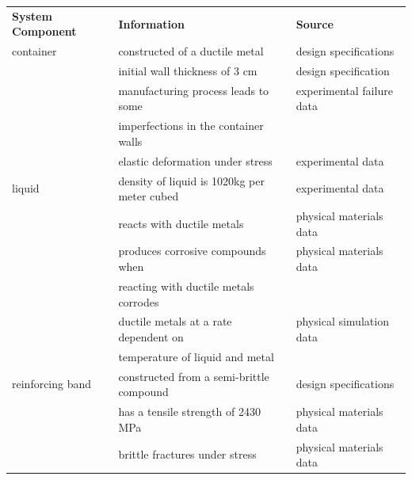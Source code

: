 \begin{table}
\begin{center}
    \begin{tabular}{lll}\Xhline{2\arrayrulewidth}
    \textbf{System Component} & \textbf{Information}                                            & \textbf{Source}          \\
    \Xhline{2\arrayrulewidth}
    container        & constructed of a ductile metal                                           & design specifications     \\
    ~                & initial wall thickness of 3 cm                                                & design specification      \\
    ~                & manufacturing process leads to some                                      & experimental failure data \\
    ~                & \qquad imperfections in the container walls & \\
    ~                & elastic deformation under stress                                         & experimental data         
    \\\hline
    liquid           & density of liquid is 1020kg per meter cubed                              & experimental data         \\
    ~                & reacts with ductile metals                                               & physical materials data   \\
    ~                & produces corrosive compounds when                      & physical materials data   \\
    ~                & \qquad reacting with ductile metals corrodes & \\ 
    ~               &  \qquad ductile metals at a rate dependent on & physical simulation data \\
    ~                & \qquad temperature of liquid and metal & \\ \hline
    reinforcing band & constructed from a semi-brittle compound                         & design specifications     \\
    ~                & has a tensile strength of 2430 MPa                                         & physical materials data   \\
    ~                & brittle fractures under stress                                           & physical materials data    
    

\end{tabular}
\end{center}
\end{table}
